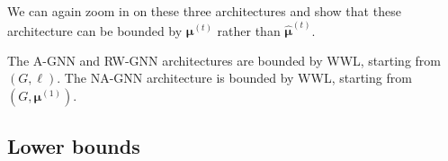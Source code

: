 We can again zoom in on these three architectures and show that these architecture can be bounded by
$\pmb{\mu}^{(t)}$ rather than $\hat{\pmb{\mu}}^{(t)}$. 
\begin{corollary}
The A-GNN  and RW-GNN architectures are bounded by WWL, starting from $(G,\pmb{\ell})$.
The NA-GNN architecture is bounded by WWL, starting from $(G,\pmb{\mu}{}^{(1)})$.
\end{corollary}


\subsection{Lower bounds}



